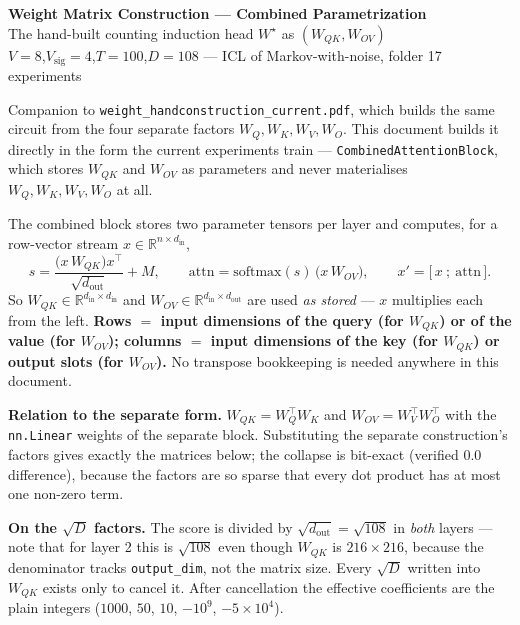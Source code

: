 \documentclass[11pt]{article}
\newcommand{\R}{\mathbb{R}}
\newcommand{\Wqk}{W_{QK}}
\newcommand{\Wov}{W_{OV}}
\newcommand{\Wq}{W_Q}
\newcommand{\Wk}{W_K}
\newcommand{\Wv}{W_V}
\newcommand{\Wo}{W_O}
\newcommand{\sd}{\sqrt{D}}
\begin{document}
\begin{center}
{\LARGE\bfseries Weight Matrix Construction --- Combined Parametrization}\\[0.4em]
{\large The hand-built counting induction head $W^\star$ as $(\Wqk,\Wov)$}\\[0.3em]
{\normalsize $V=8$,\quad $V_{\mathrm{sig}}=4$,\quad $T=100$,\quad $D=108$ \quad---\quad
ICL of Markov-with-noise, folder 17 experiments}
\end{center}
\vspace{0.4em}

\begin{center}
\footnotesize
Companion to \texttt{weight\_handconstruction\_current.pdf}, which builds the same circuit from
the four separate factors $\Wq,\Wk,\Wv,\Wo$. This document builds it directly in the form the
current experiments train --- \texttt{CombinedAttentionBlock}, which stores $\Wqk$ and $\Wov$ as
parameters and never materialises $\Wq,\Wk,\Wv,\Wo$ at all.
\end{center}
\vspace{0.4em}

\begin{conventionbox}
The combined block stores two parameter tensors per layer and computes, for a row-vector stream
$x\in\R^{n\times d_{\mathrm{in}}}$,
\[
s=\frac{\bigl(x\,\Wqk\bigr)x^\top}{\sqrt{d_{\mathrm{out}}}}+M,
\qquad
\mathrm{attn}=\mathrm{softmax}(s)\,\bigl(x\,\Wov\bigr),
\qquad
x'=\bigl[\,x\ ;\ \mathrm{attn}\,\bigr].
\]
So $\Wqk\in\R^{d_{\mathrm{in}}\times d_{\mathrm{in}}}$ and $\Wov\in\R^{d_{\mathrm{in}}\times
d_{\mathrm{out}}}$ are used \emph{as stored} --- $x$ multiplies each from the left. \textbf{Rows
$=$ input dimensions of the query (for $\Wqk$) or of the value (for $\Wov$); columns $=$ input
dimensions of the key (for $\Wqk$) or output slots (for $\Wov$).} No transpose bookkeeping is
needed anywhere in this document.

\medskip
\textbf{Relation to the separate form.} $\Wqk=\Wq^\top\Wk$ and $\Wov=\Wv^\top\Wo^\top$ with the
\texttt{nn.Linear} weights of the separate block. Substituting the separate construction's factors
gives exactly the matrices below; the collapse is bit-exact (verified $0.0$ difference), because
the factors are so sparse that every dot product has at most one non-zero term.

\medskip
\textbf{On the $\sd$ factors.} The score is divided by $\sqrt{d_{\mathrm{out}}}=\sqrt{108}$ in
\emph{both} layers --- note that for layer 2 this is $\sqrt{108}$ even though $\Wqk$ is
$216\times216$, because the denominator tracks \texttt{output\_dim}, not the matrix size. Every
$\sd$ written into $\Wqk$ exists only to cancel it. After cancellation the effective coefficients
are the plain integers ($1000$, $50$, $10$, $-10^9$, $-5\times10^4$).
\end{conventionbox}
\end{document}
